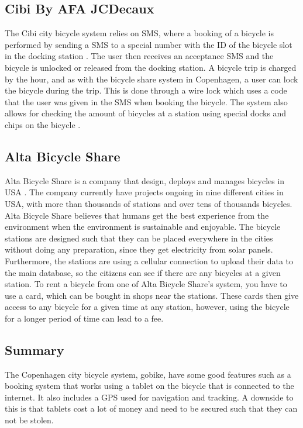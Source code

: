 \subsection{Cibi By AFA JCDecaux}
The Cibi city bicycle system relies on SMS, where a booking of a bicycle is performed by sending a SMS to a special number with the ID of the bicycle slot in the docking station \citep{misc:cibi}. 
The user then receives an acceptance SMS and the bicycle is unlocked or released from the docking station. 
A bicycle trip is charged by the hour, and as with the bicycle share system in Copenhagen, a user can lock the bicycle during the trip. 
This is done through a wire lock which uses a code that the user was given in the SMS when booking the bicycle.
The system also allows for checking the amount of bicycles at a station using special docks and chips on the bicycle \citep{misc:omcibi}.

\subsection{Alta Bicycle Share}
Alta Bicycle Share is a company that design, deploys and manages bicycles in USA \citep{misc:AltaBicycleShare}.
The company currently have projects ongoing in nine different cities in USA, with more than thousands of stations and over tens of thousands bicycles. 
Alta Bicycle Share believes that humans get the best experience from the environment when the environment is sustainable and enjoyable.
The bicycle stations are designed such that they can be placed everywhere in the cities without doing any preparation, since they get electricity from solar panels.
Furthermore, the stations are using a cellular connection to upload their data to the main database, so the citizens can see if there are any bicycles at a given station.
To rent a bicycle from one of Alta Bicycle Share's system, you have to use a card, which can be bought in shops near the stations.
These cards then give access to any bicycle for a given time at any station, however, using the bicycle for a longer period of time can lead to a fee.

\subsection{Summary}
The Copenhagen city bicycle system, gobike, have some good features such as a booking system that works using a tablet on the bicycle that is connected to the internet.
It also includes a GPS used for navigation and tracking.
A downside to this is that tablets cost a lot of money and need to be secured such that they can not be stolen. 

